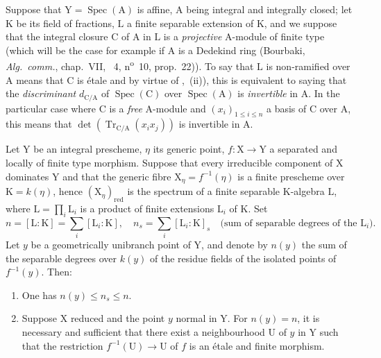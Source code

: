 \begin{env}[18.10.15]
\label{IV.18.10.15}
Suppose that $\mathrm{Y}=\operatorname{Spec}(\mathrm{A})$ is affine, $\mathrm{A}$ being integral and integrally closed; let $\mathrm{K}$ be its field of fractions, $\mathrm{L}$ a finite separable extension of $\mathrm{K}$, and we suppose that the integral closure $\mathrm{C}$ of $\mathrm{A}$ in $\mathrm{L}$ is a \emph{projective} $\mathrm{A}$-module of finite type (which will be the case for example if $\mathrm{A}$ is a Dedekind ring (Bourbaki, \emph{Alg.\ comm.}, chap.~VII, \textsection~4, n\textsuperscript{o}~10, prop.~22)).
To say that $\mathrm{L}$ is non-ramified over $\mathrm{A}$ means that $\mathrm{C}$ is \'etale  and by virtue of ,~(ii)), this is equivalent to saying that the \emph{discriminant} $d_{\mathrm{C}/\mathrm{A}}$ of $\operatorname{Spec}(\mathrm{C})$ over $\operatorname{Spec}(\mathrm{A})$ is \emph{invertible} in $\mathrm{A}$.
In the particular case where $\mathrm{C}$ is a \emph{free} $\mathrm{A}$-module and $(x_i)_{1\leq i\leq n}$ a basis of $\mathrm{C}$ over $\mathrm{A}$, this means that $\det(\operatorname{Tr}_{\mathrm{C}/\mathrm{A}}(x_ix_j))$ is invertible in $\mathrm{A}$.
\end{env}

\begin{theorem}[18.10.16]
\label{IV.18.10.16}
Let $\mathrm{Y}$ be an integral prescheme, $\eta$ its generic point, $f:\mathrm{X}\to\mathrm{Y}$ a separated and locally of finite type morphism.
Suppose that every irreducible component of $\mathrm{X}$ dominates $\mathrm{Y}$ and that the generic fibre $\mathrm{X}_\eta=f^{-1}(\eta)$ is a finite prescheme over $\mathrm{K}=k(\eta)$, hence $(\mathrm{X}_\eta)_{\mathrm{red}}$ is the spectrum of a finite separable $\mathrm{K}$-algebra $\mathrm{L}$, where $\mathrm{L}=\prod_i\mathrm{L}_i$ is a product of finite extensions $\mathrm{L}_i$ of $\mathrm{K}$.
Set
\[
  n=[\mathrm{L}:\mathrm{K}]=\sum_i[\mathrm{L}_i:\mathrm{K}],\quad n_s=\sum_i[\mathrm{L}_i:\mathrm{K}]_s\quad\text{(sum of separable degrees of the $\mathrm{L}_i$)}.
\]
Let $y$ be a geometrically unibranch point of $\mathrm{Y}$, and denote by $n(y)$ the sum of the separable degrees over $k(y)$ of the residue fields of the isolated points of $f^{-1}(y)$.
Then:
\begin{enumerate}[label=(\roman*)]
  \item One has $n(y)\leq n_s\leq n$.
  \item Suppose $\mathrm{X}$ reduced and the point $y$ normal in $\mathrm{Y}$.
For $n(y)=n$, it is necessary and sufficient that there exist a neighbourhood $\mathrm{U}$ of $y$ in $\mathrm{Y}$ such that the restriction $f^{-1}(\mathrm{U})\to\mathrm{U}$ of $f$ is an \'etale and finite morphism.
\end{enumerate}
\end{theorem}

